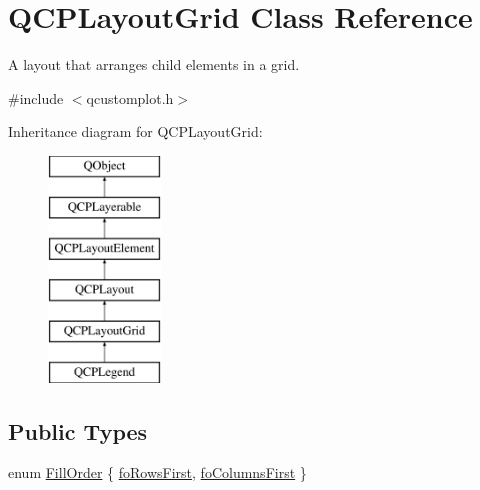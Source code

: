 \hypertarget{class_q_c_p_layout_grid}{}\section{Q\+C\+P\+Layout\+Grid Class Reference}
\label{class_q_c_p_layout_grid}


A layout that arranges child elements in a grid.  




{\ttfamily \#include $<$qcustomplot.\+h$>$}

Inheritance diagram for Q\+C\+P\+Layout\+Grid\+:\begin{figure}[H]
\begin{center}
\leavevmode
\includegraphics[height=6.000000cm]{df/dd4/class_q_c_p_layout_grid}
\end{center}
\end{figure}
\subsection*{Public Types}
\begin{DoxyCompactItemize}
\item 
enum \mbox{\hyperlink{class_q_c_p_layout_grid_a7d49ee08773de6b2fd246edfed353cca}{Fill\+Order}} \{ \mbox{\hyperlink{class_q_c_p_layout_grid_a7d49ee08773de6b2fd246edfed353ccaa0202730954e26c474cc820164aedce3e}{fo\+Rows\+First}}, 
\mbox{\hyperlink{class_q_c_p_layout_grid_a7d49ee08773de6b2fd246edfed353ccaac4cb4b796ec4822d5894b47b51627fb3}{fo\+Columns\+First}}
 \}
\end{DoxyCompactItemize}
